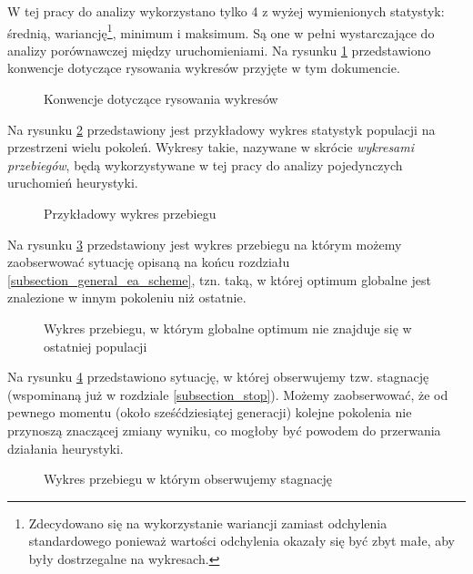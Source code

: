 \documentclass[twoside]{iisthesis}
\newcommand{\graph}[1]{}
\begin{document}
W tej pracy do analizy wykorzystano tylko 4 z wyżej wymienionych statystyk: średnią, wariancję\footnote{Zdecydowano się na wykorzystanie wariancji zamiast odchylenia standardowego ponieważ wartości odchylenia okazały się być zbyt małe, aby były dostrzegalne na wykresach.}, minimum i maksimum. Są one w pełni wystarczające do analizy porównawczej między uruchomieniami. Na rysunku \ref{plot_conventions} przedstawiono konwencje dotyczące rysowania wykresów przyjęte w tym dokumencie.

\begin{figure}[H]
	\caption{Konwencje dotyczące rysowania wykresów \label{plot_conventions}}
	\centering
	\graph{example_whiskers.tex}
\end{figure}

Na rysunku \ref{plot_random_example} przedstawiony jest przykładowy wykres statystyk populacji na przestrzeni wielu pokoleń. Wykresy takie, nazywane w skrócie \emph{wykresami przebiegów}, będą wykorzystywane w tej pracy do analizy pojedynczych uruchomień heurystyki. 

\begin{figure}[H]
	\caption{Przykładowy wykres przebiegu \label{plot_random_example}}
	\centering
	\graph{random_example.tex}
\end{figure}

Na rysunku \ref{plot_mid_opt} przedstawiony jest wykres przebiegu na którym możemy zaobserwować sytuację opisaną na końcu rozdziału \ref{subsection_general_ea_scheme}, tzn. taką, w której optimum globalne jest znalezione w innym pokoleniu niż ostatnie.

\begin{figure}[H]
	\caption{Wykres przebiegu, w którym globalne optimum nie znajduje się w ostatniej populacji \label{plot_mid_opt}}
	\centering
	\graph{mid_optimum.tex}
\end{figure}

Na rysunku \ref{plot_stagnation} przedstawiono sytuację, w której obserwujemy tzw. stagnację (wspominaną już w rozdziale \ref{subsection_stop}). Możemy zaobserwować, że od pewnego momentu (około sześćdziesiątej generacji) kolejne pokolenia nie przynoszą znaczącej zmiany wyniku, co mogłoby być powodem do przerwania działania heurystyki.

\begin{figure}[H]
	\caption{Wykres przebiegu w którym obserwujemy stagnację \label{plot_stagnation}}
	\centering
	\graph{stagnation.tex}
\end{figure}
\end{document}
